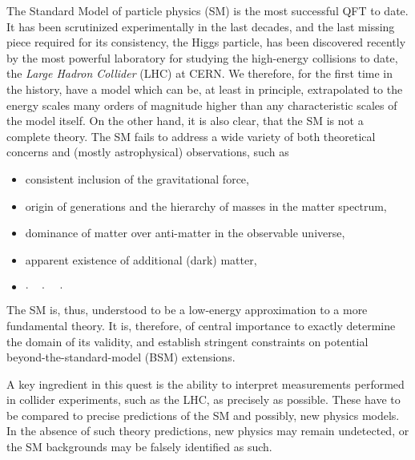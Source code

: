 The Standard Model of particle physics (SM) is the most successful QFT to date.
It has been scrutinized experimentally in the last decades, and the
last missing piece required for its consistency, the Higgs particle, has been discovered recently by the most
powerful laboratory for studying  the high-energy collisions to date, the \emph{Large Hadron Collider} (LHC) at CERN.
We therefore, for the first time in the history, have a model which can be, at least in principle, extrapolated to the energy scales many orders of magnitude higher than
any characteristic scales of the model itself.
On the other hand, it is also clear, that the SM is not a complete theory.
The SM fails to address a wide variety of both theoretical concerns and (mostly astrophysical) observations, such as
\begin{itemize}[nosep,topsep=-1.6ex]
  \item consistent inclusion of the gravitational force,
  \item origin of generations and the hierarchy of masses in the matter spectrum,
  \item dominance of matter over anti-matter in the observable universe, 
  \item apparent existence of additional (dark) matter,
  \item[]  $\cdot\quad\cdot\quad\cdot$ %
\end{itemize}
The SM is, thus, understood to be a low-energy approximation to a more fundamental theory.
It is, therefore, of central importance to exactly determine the domain of its validity,
and establish stringent constraints on potential beyond-the-standard-model (BSM) extensions.

A key ingredient in this quest is the ability to interpret measurements performed in collider experiments, such as the LHC, as precisely as possible.
These have to be compared to precise predictions of the SM and possibly, new physics models.
In the absence of such theory predictions, new physics may remain undetected, or the SM backgrounds may be falsely identified as such.

